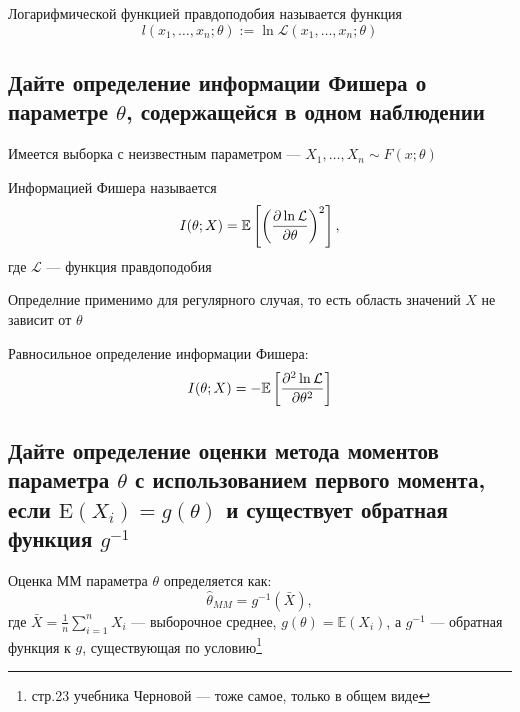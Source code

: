 \documentclass{article}
\begin{document}

 Логарифмической функцией правдоподобия называется функция
\begin{equation*}
    l\left(x_{1}, \ldots, x_{n} ; \theta\right):=\ln \mathcal{L}\left(x_{1}, \ldots, x_{n} ; \theta\right)
\end{equation*}

\subsection{Дайте определение информации Фишера о параметре $\theta$, содержащейся в одном наблюдении}
Имеется выборка с неизвестным параметром — $X_1,\ldots,X_n\sim F(x;\theta)$

 Информацией Фишера называется 
\begin{equation*}
    I(\theta;X)=\mathbb{E}\left[\left(\frac{\partial \ln\mathcal{L}}{\partial\theta}\right)^2\right],
\end{equation*}
где $\mathcal{L}$ — функция правдоподобия

\comment Определние применимо для регулярного случая, то есть область значений $X$ не зависит от $\theta$

 Равносильное определение информации Фишера:
\begin{equation*}
    I(\theta;X)=-\mathbb{E}\left[\frac{\partial^2\ln\mathcal{L}}{\partial\theta^2}\right]
\end{equation*}

\subsection{Дайте определение оценки метода моментов параметра $\theta$ с использованием первого момента, если $\mathrm{E}\left(X_{i}\right)=g(\theta)$ и существует обратная функция $g^{-1}$}
Оценка ММ параметра $\theta$ определяется как:
\begin{equation*}
    \hat{\theta}_{MM} = g^{-1}\left( \bar{X} \right),
\end{equation*}
где $\bar{X} = \frac{1}{n} \sum_{i=1}^n X_i$ — выборочное среднее, $g(\theta) = \mathbb{E}(X_i)$, а $g^{-1}$ — обратная функция к $g$, существующая по условию\footnote{стр.23 учебника Черновой — тоже самое, только в общем виде}
\end{document}

